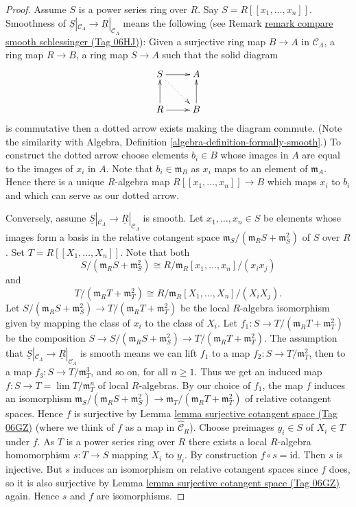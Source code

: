 \documentclass{amsart}
\theoremstyle{plain}
\theoremstyle{definition}
\theoremstyle{remark}
\numberwithin{equation}{subsection}
\def\lim{\mathop{\mathrm{lim}}\nolimits}
\begin{document}
\begin{proof}
Assume $S$ is a power series ring over $R$. Say $S = R[[x_1, \ldots, x_n]]$.
Smoothness of
$\underline{S}|_{\mathcal{C}_\Lambda} \to \underline{R}|_{\mathcal{C}_\Lambda}$
means the following (see Remark \href{https://stacks.math.columbia.edu/tag/06HJ}{remark compare smooth schlessinger (Tag 06HJ)}):
Given a surjective ring map $B \to A$ in
$\mathcal{C}_\Lambda$, a ring map $R \to B$, a ring map $S \to A$ such that
the solid diagram
$$
\xymatrix{
S \ar[r] \ar@{..>}[rd] & A \\
R \ar[u] \ar[r] & B \ar[u]
}
$$
is commutative then a dotted arrow exists making the diagram commute.
(Note the similarity with
Algebra, Definition \ref{algebra-definition-formally-smooth}.)
To construct the dotted arrow choose elements $b_i \in B$ whose images
in $A$ are equal to the images of $x_i$ in $A$. Note that
$b_i \in \mathfrak m_B$ as $x_i$ maps to an element of $\mathfrak m_A$.
Hence there is a unique $R$-algebra map $R[[x_1, \ldots, x_n]] \to B$
which maps $x_i$ to $b_i$ and which can serve as our dotted arrow.

\medskip\noindent
Conversely, assume
$\underline{S}|_{\mathcal{C}_\Lambda} \to \underline{R}|_{\mathcal{C}_\Lambda}$
is smooth. Let $x_1, \ldots, x_n \in S$ be elements whose images
form a basis in the relative cotangent space
$\mathfrak m_S/(\mathfrak m_R S + \mathfrak m_S^2)$ of $S$ over $R$.
Set $T = R[[X_1, \ldots, X_n]]$. Note that both
$$
S/(\mathfrak m_R S + \mathfrak m_S^2) \cong
R/\mathfrak m_R[x_1, \ldots, x_n]/(x_ix_j)
$$
and
$$
T/(\mathfrak m_R T + \mathfrak m_T^2) \cong
R/\mathfrak m_R[X_1, \ldots, X_n]/(X_iX_j).
$$
Let
$S/(\mathfrak m_R S + \mathfrak m_S^2) \to
T/(\mathfrak m_R T + \mathfrak m_T^2)$
be the local $R$-algebra isomorphism given by mapping
the class of $x_i$ to the class of $X_i$. Let
$f_1 : S \to T/(\mathfrak m_R T + \mathfrak m_T^2)$ be the
composition
$S \to S/(\mathfrak m_R S + \mathfrak m_S^2)
\to T/(\mathfrak m_R T + \mathfrak m_T^2)$.
The assumption that
$\underline{S}|_{\mathcal{C}_\Lambda} \to \underline{R}|_{\mathcal{C}_\Lambda}$
is smooth means we can lift $f_1$ to a map
$f_2 : S \to T/\mathfrak{m}_T^2$, then to a map
$f_3 : S \to T/\mathfrak{m}_T^3$, and so on, for all $n \geq 1$. Thus
we get an induced map $f : S \to T = \lim T/\mathfrak m_T^n$
of local $R$-algebras. By our choice of $f_1$, the map $f$ induces an
isomorphism
$\mathfrak m_S/(\mathfrak m_R S + \mathfrak m_S^2) \to
\mathfrak m_T/(\mathfrak m_R T + \mathfrak m_T^2)$
of relative cotangent spaces.
Hence $f$ is surjective by
Lemma \href{https://stacks.math.columbia.edu/tag/06GZ}{lemma surjective cotangent space (Tag 06GZ)}
(where we think of $f$ as a map in $\widehat{\mathcal{C}}_R$).
Choose preimages $y_i \in S$ of $X_i \in T$ under $f$. As $T$ is a
power series ring over $R$ there exists a local
$R$-algebra homomorphism $s : T \to S$ mapping $X_i$ to $y_i$.
By construction $f \circ s = \text{id}$. Then $s$ is injective.
But $s$ induces an isomorphism on relative cotangent spaces since
$f$ does, so it is also surjective by
Lemma \href{https://stacks.math.columbia.edu/tag/06GZ}{lemma surjective cotangent space (Tag 06GZ)}
again. Hence $s$ and $f$ are isomorphisms.
\end{proof}
\end{document}
